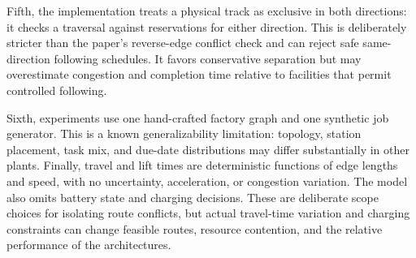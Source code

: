 \documentclass[11pt]{article}
\begin{document}
Fifth, the implementation treats a physical track as exclusive in both
directions: it checks a traversal against reservations for either direction.
This is deliberately stricter than the paper's reverse-edge conflict check
and can reject safe same-direction following schedules. It favors
conservative separation but may overestimate congestion and completion time
relative to facilities that permit controlled following.

Sixth, experiments use one hand-crafted factory graph and one synthetic job
generator. This is a known generalizability limitation: topology, station
placement, task mix, and due-date distributions may differ substantially in
other plants. Finally, travel and lift times are deterministic functions of
edge lengths and speed, with no uncertainty, acceleration, or congestion
variation. The model also omits battery state and charging decisions. These
are deliberate scope choices for isolating route conflicts, but actual
travel-time variation and charging constraints can change feasible routes,
resource contention, and the relative performance of the architectures.
\end{document}
